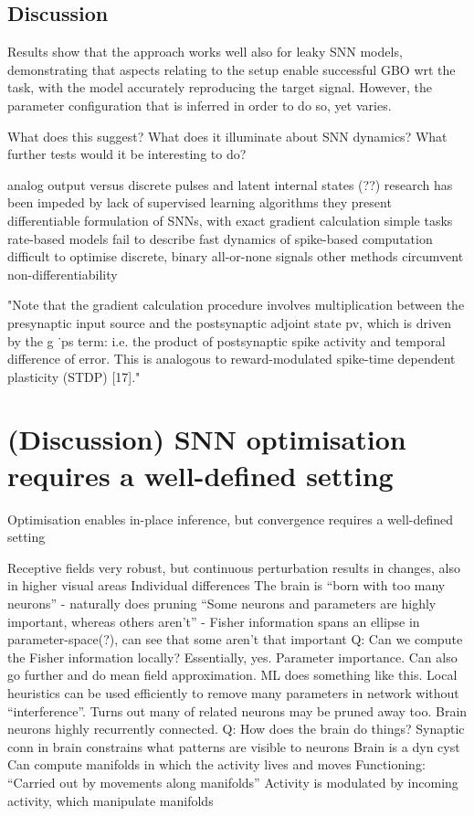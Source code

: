 \documentclass[mphil,deptreport,ianc]{infthesis} %
\begin{document}
\section{Discussion}

Results show that the approach works well also for leaky SNN models, demonstrating that aspects relating to the setup enable successful GBO wrt the task, with the model accurately reproducing the target signal.
However, the parameter configuration that is inferred in order to do so, yet varies.

What does this suggest? What does it illuminate about SNN dynamics? What further tests would it be interesting to do?

analog output versus discrete pulses and latent internal states (??)
research has been impeded by lack of supervised learning algorithms
they present differentiable formulation of SNNs, with exact gradient calculation
simple tasks
rate-based models fail to describe fast dynamics of spike-based computation
difficult to optimise discrete, binary all-or-none signals
other methods circumvent non-differentiability

"Note that the gradient calculation procedure involves multiplication between the presynaptic input source and the postsynaptic adjoint state pv, which is driven by the g ˙ps term: i.e. the product of postsynaptic spike activity and temporal difference of error. This is analogous to reward-modulated spike-time dependent plasticity (STDP) [17]."



\chapter{(Discussion) SNN optimisation requires a well-defined setting}

Optimisation enables in-place inference, but convergence requires a well-defined setting

Receptive fields very robust, but continuous perturbation results in changes, also in higher visual areas
Individual differences
The brain is “born with too many neurons” - naturally does pruning
“Some neurons and parameters are highly important, whereas others aren’t” - Fisher information spans an ellipse in parameter-space(?), can see that some aren’t that important
Q: Can we compute the Fisher information locally? Essentially, yes. Parameter importance. Can also go further and do mean field approximation. ML does something like this. Local heuristics can be used efficiently to remove many parameters in network without “interference”. Turns out many of related neurons may be pruned away too.
Brain neurons highly recurrently connected.
Q: How does the brain do things?
Synaptic conn in brain constrains what patterns are visible to neurons
Brain is a dyn cyst
Can compute manifolds in which the activity lives and moves
Functioning: “Carried out by movements along manifolds”
Activity is modulated by incoming activity, which manipulate manifolds
\end{document}
